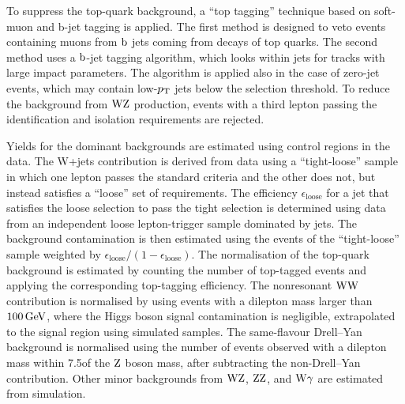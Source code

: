 \documentclass[11pt,twoside,a4paper,cmspaper,final]{cms-tdr}
\begin{document}
To suppress the top-quark background, a ``top tagging'' technique
based on soft-muon and b-jet tagging is
applied.  The first method is designed to veto events containing muons
from $\mathrm{b}$ jets coming from decays of top quarks.  The second method
uses a $\mathrm{b}$-jet tagging algorithm, which looks within jets for tracks
with large impact parameters.  The algorithm is applied also in the case
of zero-jet events, which may contain low-$p_{\mathrm{T}}$ jets below the
selection threshold.  To reduce the background from $\mathrm{W}\mathrm{Z}$ production,
events with a third lepton passing the identification and isolation
requirements are rejected.

Yields for the dominant backgrounds are estimated using control
regions in the data.  The W+jets contribution is derived
from data using a ``tight-loose'' sample in which one lepton passes the
standard criteria and the other does not, but instead
satisfies a ``loose'' set of requirements.  The efficiency
$\epsilon_{\text{loose}}$ for a jet that satisfies the loose selection
to pass the tight selection is determined using data from an independent
loose lepton-trigger sample dominated by jets.  The background contamination
is then estimated using the events of the ``tight-loose'' sample weighted
by $\epsilon_{\text{loose}}/(1-\epsilon_{\text{loose}})$.  The
normalisation of the top-quark background
is estimated by counting the number of top-tagged events and applying the
corresponding top-tagging efficiency.  The nonresonant $\mathrm{W}\mathrm{W}$ contribution
is normalised by using events with a dilepton mass larger than $100\,\text{Ge\hspace{-.08em}V}$,
where the Higgs boson signal contamination is negligible, extrapolated
to the signal region using simulated samples.  The same-flavour Drell--Yan background
is normalised using the number of events observed with a dilepton
mass within 7.5\GeV of the $\mathrm{Z}$ boson mass, after subtracting the non-Drell--Yan contribution.
Other minor backgrounds from $\mathrm{W}\mathrm{Z}$, $\mathrm{Z}\mathrm{Z}$, and
$\mathrm{W}\gamma$ are estimated from simulation.
\end{document}
